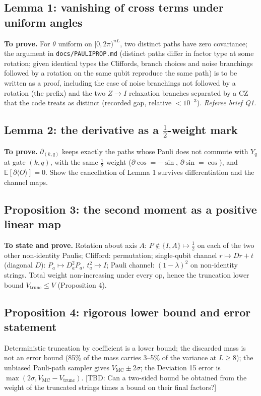 \documentclass[11pt,a4paper]{article}
\newcommand{\tbd}[1]{\textcolor{orange!80!black}{[TBD: #1]}}
\begin{document}
\subsection{Lemma 1: vanishing of cross terms under uniform angles}
\textbf{To prove.} For $\theta$ uniform on $[0, 2\pi)^{nL}$, two distinct paths have zero covariance; the argument in \texttt{docs/PAULIPROP.md} (distinct paths differ in factor type at some rotation; given identical types the Cliffords, branch choices and noise branchings followed by a rotation on the same qubit reproduce the same path) is to be written as a proof, including the case of noise branchings not followed by a rotation (the prefix) and the two $Z \to I$ relaxation branches separated by a CZ that the code treats as distinct (recorded gap, relative $< 10^{-3}$). \emph{Referee brief Q1.}

\subsection{Lemma 2: the derivative as a $\tfrac12$-weight mark}
\textbf{To prove.} $\partial_{(k,q)}$ keeps exactly the paths whose Pauli does not commute with $Y_q$ at gate $(k, q)$, with the same $\tfrac12$ weight ($\partial\cos = -\sin$, $\partial\sin = \cos$), and $\mathbb{E}[\partial\langle O\rangle] = 0$. Show the cancellation of Lemma 1 survives differentiation and the channel maps.

\subsection{Proposition 3: the second moment as a positive linear map}
\textbf{To state and prove.} Rotation about axis $A$: $P \notin \{I, A\} \mapsto \tfrac12$ on each of the two other non-identity Paulis; Clifford: permutation; single-qubit channel $r \mapsto Dr + t$ (diagonal $D$): $P_a \mapsto D_a^2 P_a$, $t_a^2 \mapsto I$; Pauli channel: $(1-\lambda)^2$ on non-identity strings. Total weight non-increasing under every op, hence the truncation lower bound $V_{\mathrm{trunc}} \leq V$ (Proposition 4).

\subsection{Proposition 4: rigorous lower bound and error statement}
Deterministic truncation by coefficient is a lower bound; the discarded mass is not an error bound (85\% of the mass carries 3--5\% of the variance at $L \geq 8$); the unbiased Pauli-path sampler gives $V_{\mathrm{MC}} \pm 2\sigma$; the Deviation 15 error is $\max(2\sigma, V_{\mathrm{MC}} - V_{\mathrm{trunc}})$. \tbd{Can a two-sided bound be obtained from the weight of the truncated strings times a bound on their final factors?}
\end{document}

